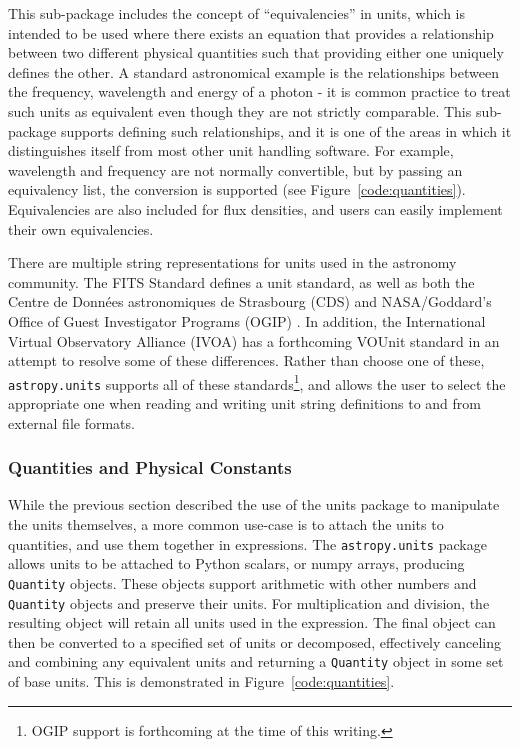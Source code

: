 \documentclass[traditabstract]{aa}
\begin{document}
This sub-package includes the concept of ``equivalencies'' in units, which is
intended to be used where there exists an equation that provides a relationship
between two different physical quantities such that providing either one
uniquely defines the other. A standard astronomical example is the
relationships between the frequency, wavelength and energy of a photon - it is
common practice to treat such units as equivalent even though they are not
strictly comparable. This sub-package supports defining such relationships, and
it is one of the areas in which it distinguishes itself from most other unit
handling software. For example, wavelength and frequency are not normally
convertible, but by passing an equivalency list, the conversion is supported
(see Figure~\ref{code:quantities}). Equivalencies are also included for flux
densities, and users can easily implement their own equivalencies.

There are multiple string representations for units used in the astronomy
community. The FITS Standard \cite{fits2008} defines a unit standard, as well
as both the Centre de Donn\'ees astronomiques de Strasbourg (CDS)
\citep{ochsenbein2000cds} and NASA/Goddard's Office of Guest Investigator
Programs (OGIP) \citep{george1995ogip}. In addition, the International Virtual
Observatory Alliance (IVOA) has a forthcoming VOUnit standard
\citep{derriere2012vounit} in an attempt to resolve some of these differences.
Rather than choose one of these, \texttt{astropy.units} supports all of these
standards\footnote{OGIP support is forthcoming at the time of this writing.},
and allows the user to select the appropriate one when reading and writing unit
string definitions to and from external file formats.

\subsubsection{Quantities and Physical Constants}

\label{sec:quantities}

While the previous section described the use of the units package to manipulate
the units themselves, a more common use-case is to attach the units to
quantities, and use them together in expressions. The \texttt{astropy.units}
package allows units to be attached to Python scalars, or \gls{numpy} arrays,
producing \texttt{Quantity} objects. These objects support arithmetic with
other numbers and \texttt{Quantity} objects and preserve their units. For
multiplication and division, the resulting object will retain all units used in
the expression. The final object can then be converted to a specified set of
units or decomposed, effectively canceling and combining any equivalent units
and returning a \texttt{Quantity} object in some set of base units. This is
demonstrated in Figure~\ref{code:quantities}.
\end{document}
